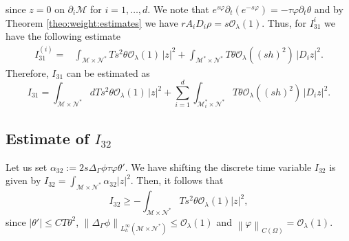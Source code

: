 \documentclass[11pt,oneside,leqno]{amsart}
\numberwithin{equation}{section}
\numberwithin{equation}{section}
\begin{document}
since $z=0$ on $\partial_{i}\mathcal{M}$ for $i=1,\ldots, d$. We note that $e^{s\varphi}\partial_{t}(e^{-s\varphi})=-\tau\varphi\partial_{t}\theta$ and by Theorem \ref{theo:weight:estimates} we have $rA_{i}D_{i}\rho=s\mathcal{O}_{\lambda}(1)$. Thus, for $I_{31}^{i}$ we have the following estimate
\begin{equation}
\begin{split}
I_{31}^{(i)}=&\int_{\mathcal{M}\times\mathcal{N}^{\ast}}Ts^{2}\theta\mathcal{O}_{\lambda}(1)\,|z|^{2}+\int_{\mathcal{M}^{\ast}\times\mathcal{N}^{\ast}}T\theta\mathcal{O}_{\lambda}((sh)^{2})\,|D_{i}z|^{2}.
    \end{split}
\end{equation}
Therefore, $I_{31}$ can be estimated as 
\begin{equation*}
I_{31}=\int_{\mathcal{M}\times\mathcal{N}^{\ast}}dTs^{2}\theta\mathcal{O}_{\lambda}(1)\,|z|^{2}+\sum_{i=1}^{d}\int_{\mathcal{M}_{i}^{\ast}\times\mathcal{N}^{\ast}}T\theta\mathcal{O}_{\lambda}((sh)^{2})\,|D_{i}z|^{2}.
\end{equation*}
\subsection{Estimate of $I_{32}$}
Let us set $\alpha_{32}:=2s\Delta_{\Gamma}\phi\tau\varphi\theta'$. We have shifting the discrete time variable $I_{32}$ is given by $\displaystyle I_{32}=\int_{\mathcal{M}\times\mathcal{N}^{\ast}}\alpha_{32}|z|^{2}$. Then, it follows that 
$$I_{32}\geq -\int_{\mathcal{M}\times\mathcal{N}^{\ast}}Ts^{2}\theta\mathcal{O}_{\lambda}(1)|z|^{2},$$
since $|\theta'|\leq CT\theta^{2}$, $\left\| \Delta_{\Gamma}\phi\right\|_{L^{\infty}_{h}(\mathcal{M}\times\mathcal{N}^{\ast})}\leq \mathcal{O}_{\lambda}(1)$ and $\left\| \varphi\right\|_{C(\Omega)}=\mathcal{O}_{\lambda}(1)$.
\end{document}
